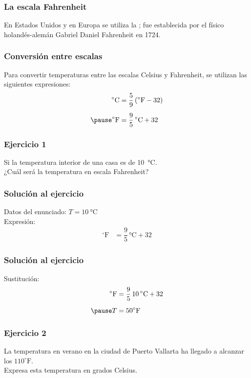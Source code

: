 \documentclass[14pt]{beamer}
\begin{document}
\begin{frame}
\frametitle{La escala Fahrenheit}
En Estados Unidos y en Europa se utiliza la ; \pause fue establecida
por el físico holandés-alemán Gabriel Daniel Fahrenheit en 1724.
\end{frame}
\begin{frame}
\frametitle{Conversión entre escalas}
Para convertir temperaturas entre las escalas Celsius y Fahrenheit, se utilizan las siguientes expresiones:
\pause
\begin{eqnarray*}
\begin{aligned}
\unit{\degreeCelsius} &= \dfrac{5}{9} \left( ^{\circ}\text{F} - 32 \right) \\[0.5em] \pause
^{\circ}\text{F} &= \dfrac{9}{5} \, \unit{\degreeCelsius} + 32
\end{aligned}
\end{eqnarray*}
\end{frame}
\begin{frame}
\frametitle{Ejercicio 1}
Si la temperatura interior de una casa es de \SI{10}{\degreeCelsius}.
\\
\bigskip
\pause
¿Cuál será la temperatura en escala Fahrenheit?
\end{frame}
\begin{frame}
\frametitle{Solución al ejercicio}
Datos del enunciado: $T = \SI{10}{\degreeCelsius}$
\\
\bigskip
\pause
Expresión:
\pause
\begin{align*}
^{\circ}\text{F} &= \dfrac{9}{5} \, \unit{\degreeCelsius} + 32
\end{align*}
\end{frame}
\begin{frame}
\frametitle{Solución al ejercicio}
Sustitución:
\pause
\begin{eqnarray*}
\begin{aligned}
^{\circ}\text{F} &= \dfrac{9}{5} \, \SI{10}{\degreeCelsius} + 32 \\[0.5em] \pause
T &= 50 ^{\circ} \text{F}
\end{aligned}
\end{eqnarray*}
\end{frame}
\begin{frame}
\frametitle{Ejercicio 2}
La temperatura en verano en la ciudad de Puerto Vallarta ha llegado a alcanzar los $110 ^{\circ} \text{F}$.
\\
\bigskip
\pause
Expresa esta temperatura en grados Celsius.
\end{frame}
\end{document}
